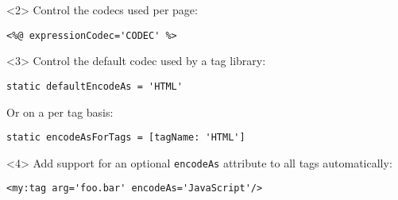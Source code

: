 {\begin{frame}
    \begin{onlyenv}<2>
      Control the codecs used per page:
      \begin{center}
        \begin{minipage}{\textwidth}
          \begin{verbatim}
<%@ expressionCodec='CODEC' %>
          \end{verbatim}
        \end{minipage}
      \end{center}
    \end{onlyenv}

    \begin{onlyenv}<3>
      Control the default codec used by a tag library:
      \begin{center}
        \begin{minipage}{\textwidth}
          \begin{verbatim}
static defaultEncodeAs = 'HTML'
          \end{verbatim}
        \end{minipage}
      \end{center}

      Or on a per tag basis:
      \begin{center}
        \begin{minipage}{\textwidth}
          \begin{verbatim}
static encodeAsForTags = [tagName: 'HTML']
          \end{verbatim}
        \end{minipage}
      \end{center}
    \end{onlyenv}

    \begin{onlyenv}<4>
      Add support for an optional \verb|encodeAs| attribute to all tags automatically:
      \begin{center}
        \begin{minipage}{\textwidth}
          \begin{verbatim}
<my:tag arg='foo.bar' encodeAs='JavaScript'/>
          \end{verbatim}
        \end{minipage}
      \end{center}
    \end{onlyenv}


\end{frame}}
